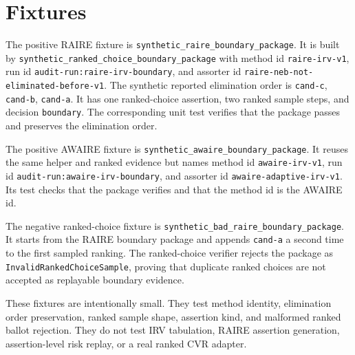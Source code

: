 \section{Fixtures}

The positive RAIRE fixture is
\texttt{synthetic\_raire\_boundary\_package}. It is built by
\texttt{synthetic\_ranked\_choice\_boundary\_package} with method id
\texttt{raire-irv-v1}, run id \texttt{audit-run:raire-irv-boundary}, and
assorter id \texttt{raire-neb-not-eliminated-before-v1}. The synthetic reported
elimination order is \texttt{cand-c}, \texttt{cand-b}, \texttt{cand-a}. It has
one ranked-choice assertion, two ranked sample steps, and decision
\texttt{boundary}. The corresponding unit test verifies that the package passes
and preserves the elimination order.

The positive AWAIRE fixture is
\texttt{synthetic\_awaire\_boundary\_package}. It reuses the same helper and
ranked evidence but names method id \texttt{awaire-irv-v1}, run id
\texttt{audit-run:awaire-irv-boundary}, and assorter id
\texttt{awaire-adaptive-irv-v1}. Its test checks that the package verifies and
that the method id is the AWAIRE id.

The negative ranked-choice fixture is
\texttt{synthetic\_bad\_raire\_boundary\_package}. It starts from the RAIRE
boundary package and appends \texttt{cand-a} a second time to the first sampled
ranking. The ranked-choice verifier rejects the package as
\texttt{InvalidRankedChoiceSample}, proving that duplicate ranked choices are
not accepted as replayable boundary evidence.

These fixtures are intentionally small. They test method identity, elimination
order preservation, ranked sample shape, assertion kind, and malformed ranked
ballot rejection. They do not test IRV tabulation, RAIRE assertion generation,
assertion-level risk replay, or a real ranked CVR adapter.
